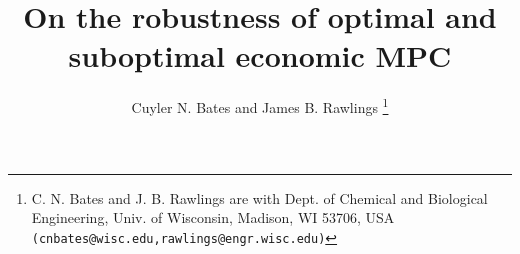 \documentclass{article}
\title{On the robustness of optimal and suboptimal economic MPC}
\author{Cuyler N. Bates and James B. Rawlings
  \thanks{C. N. Bates and J. B. Rawlings are with Dept. of Chemical and
    Biological Engineering, Univ. of Wisconsin, Madison, WI 53706, USA
    \texttt{\footnotesize (cnbates@wisc.edu,rawlings@engr.wisc.edu)}}}
\begin{document}
\maketitle

\begin{abstract}
\begin{comment}
Traditionally, the problem of dynamic economic optimization of processes has
been divided into two subproblems. First, a static economic optimization
is performed to select the process steady state with the lowest cost. Then,
a regular is designed to guide the system dynamically to the chosen steady
state without regard for the dynamic cost incurred. Increasingly, however, 
due to demand for improving dynamic economic performance and a commensurate
increase in the quality of available dynamic models and computational tools
, interest in dynamic economic optimization methods is growing rapidly. In 
this paper, we investigate the properties of economic model predictive 
control, which is the use of an economic objective function in place of the
regulatory objective function widely used in model predictive control. \\
When considering the general economic model predictive control problem,
however, we encounter several crucial questions. Firstly, economic model
predictive control problems are almost never convex. Therefore, even with
state of the art solution techniques, we can, in general, hope only to
find a local optimum, not a global optimum as is universally assumed in
previous papers on the subject. Secondly, when operating a control scheme,
there are inevitably disturbances affecting the system. We would 
therefore like to know under what conditions the economic control law 
designed for the nominal system is able to reject those disturbances. \\
The contributions of the paper are as follows. First, we extend the
robustness result of \citep{pannocchia:rawlings:wright:2011} to a more 
general class of cost functions. We then show that these results apply to
suboptimal economic MPC. Finally, we present a proof giving guarantees on
the economic performance of suboptimal economic MPC. The conclusion of the
paper is that not only can the economic performance of optimal economic MPC
be extended to the suboptimal case, but in addition the impressive 
robustness of nominal (noneconomic) MPC can be extended to both optimal and
suboptimal economic MPC as well. 
\end{comment}
\end{abstract}
\end{document}
